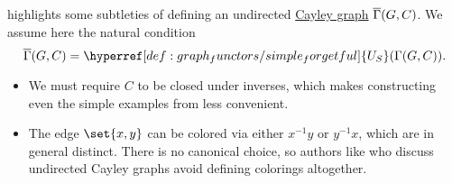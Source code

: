 \begin{remark}\label{rem:undirected_cayley_graph}
   highlights some subtleties of defining an undirected \hyperref[def:cayley_graph]{Cayley graph} \( \oline{\Gamma}(G, C) \). We assume here the natural condition
  \begin{equation*}
    \oline{\Gamma}(G, C) = \hyperref[def:graph_functors/simple_forgetful]{U_S}(\Gamma(G, C)).
  \end{equation*}

  \begin{itemize}
    \item We must require \( C \) to be closed under inverses, which makes constructing even the simple examples from  less convenient.

    \item The edge \( \set{ x, y } \) can be colored via either \( x^{-1} y \) or \( y^{-1} x \), which are in general distinct. There is no canonical choice, so authors like  who discuss undirected Cayley graphs avoid defining colorings altogether.
  \end{itemize}
\end{remark}

